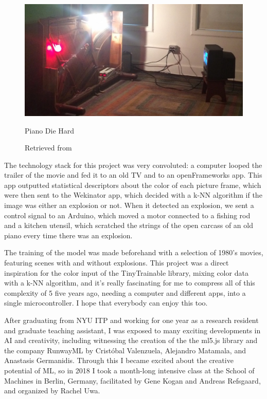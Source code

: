 \begin{figure}[ht]
  \centering
  \includegraphics[width=0.80\linewidth,height=0.40\textheight,keepaspectratio]{images/piano-die-hard.jpg}
  \caption{Piano Die Hard}
  \caption*{Retrieved from \cite{website-alt-ai}}
  \label{fig:piano-die-hard}
\end{figure}

The technology stack for this project was very convoluted: a computer looped the trailer of the movie and fed it to an old TV and to an openFrameworks app. This app outputted statistical descriptors about the color of each picture frame, which were then sent to the Wekinator app, which decided with a \acrshort{k-NN} algorithm if the image was either an explosion or not. When it detected an explosion, we sent a control signal to an Arduino, which moved a motor connected to a fishing rod and a kitchen utensil, which scratched the strings of the open carcass of an old piano every time there was an explosion.

The training of the model was made beforehand with a selection of 1980's movies, featuring scenes with and without explosions. This project was a direct inspiration for the color input of the TinyTrainable library, mixing color data with a \acrshort{k-NN} algorithm, and it's really fascinating for me to compress all of this complexity of 5 five years ago, needing a computer and different apps, into a single microcontroller. I hope that everybody can enjoy this too.

After graduating from \acrshort{NYU} \acrshort{ITP} and working for one year as a research resident and graduate teaching assistant, I was exposed to many exciting developments in \acrshort{AI} and creativity, including witnessing the creation of the the ml5.js library and the company RunwayML by Cristóbal Valenzuela, Alejandro Matamala, and Anastasis Germanidis. Through this I became excited about the creative potential of \acrshort{ML}, so in 2018 I took a month-long intensive class at the School of Machines in Berlin, Germany, facilitated by Gene Kogan and Andreas Refsgaard, and organized by Rachel Uwa.

